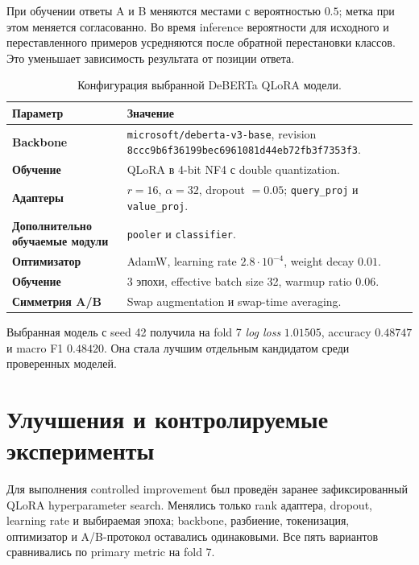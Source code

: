 \documentclass[a4paper,11pt]{article}
\newcommand{\metric}{\textit{log loss}}
\newcommand{\code}[1]{\texttt{#1}}
\begin{document}
При обучении ответы A и B меняются местами с вероятностью $0.5$; метка при
этом меняется согласованно. Во время inference вероятности для исходного и
переставленного примеров усредняются после обратной перестановки классов.
Это уменьшает зависимость результата от позиции ответа.

\begin{table}[htbp]
\centering
\caption{Конфигурация выбранной DeBERTa QLoRA модели.}
\label{tab:deberta-card}
\small
\begin{tabularx}{\textwidth}{|>{\bfseries}p{}|Y|}
\hline
{} Параметр & Значение \\ \hline
Backbone & \code{microsoft/deberta-v3-base}, revision \code{8ccc9b6f36199bec6961081d44eb72fb3f7353f3}. \\ \hline
Обучение & QLoRA в 4-bit NF4 с double quantization. \\ \hline
Адаптеры & $r=16$, $\alpha=32$, dropout $=0.05$; \code{query\_proj} и \code{value\_proj}. \\ \hline
Дополнительно обучаемые модули & \code{pooler} и \code{classifier}. \\ \hline
Оптимизатор & AdamW, learning rate $2.8\cdot10^{-4}$, weight decay $0.01$. \\ \hline
Обучение & 3 эпохи, effective batch size 32, warmup ratio 0.06. \\ \hline
Симметрия A/B & Swap augmentation и swap-time averaging. \\ \hline
\end{tabularx}
\end{table}

Выбранная модель с seed 42 получила на fold 7 \metric{} $1.01505$, accuracy
$0.48747$ и macro F1 $0.48420$. Она стала лучшим отдельным кандидатом среди
проверенных моделей.

\section{Улучшения и контролируемые эксперименты}

Для выполнения controlled improvement был проведён заранее зафиксированный
QLoRA hyperparameter search. Менялись только rank адаптера, dropout, learning
rate и выбираемая эпоха; backbone, разбиение, токенизация, оптимизатор и
A/B-протокол оставались одинаковыми. Все пять вариантов сравнивались по
primary metric на fold 7.
\end{document}
